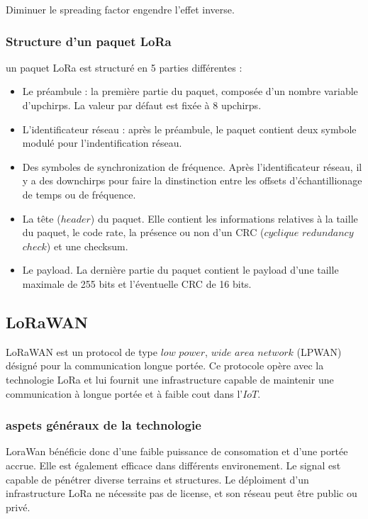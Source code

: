 Diminuer le spreading factor engendre l'effet inverse.

\subsubsection{Structure d'un paquet LoRa}

un paquet LoRa est structuré en 5 parties différentes :

\vspace{0.1cm}

\begin{itemize}
\item Le préambule : la première partie du paquet, composée d'un nombre variable d'upchirps. La valeur par défaut est fixée à 8 upchirps.
\item L'identificateur réseau : après le préambule, le paquet contient deux symbole modulé pour l'indentification réseau.
\item Des symboles de synchronization de fréquence. Après l'identificateur réseau, il y a des downchirps pour faire la dinstinction entre les offsets d'échantillionage de temps ou de fréquence.
\item La tête ($header$) du paquet. Elle contient les informations relatives à la taille du paquet, le code rate, la présence ou non d'un CRC ($cyclique$ $redundancy$ $check$) et une checksum.
\item Le payload. La dernière partie du paquet contient le payload d'une taille maximale de 255 bits et l'éventuelle CRC de 16 bits.
\end{itemize}




\subsection{LoRaWAN}

LoRaWAN est un protocol de type $low$ $power$, $wide$ $area$ $network$ (LPWAN) désigné pour la communication longue portée. Ce protocole opère avec la technologie LoRa et lui fournit une infrastructure capable de maintenir une communication à longue portée et à faible cout dans l'$IoT$.

\subsubsection{aspets généraux de la technologie}

LoraWan bénéficie donc d'une faible puissance de consomation et d'une portée accrue. Elle est également efficace dans différents environement. Le signal est capable de pénétrer diverse terrains et structures.
Le déploiment d'un infrastructure LoRa ne nécessite pas de license, et son réseau peut être public ou privé. 

